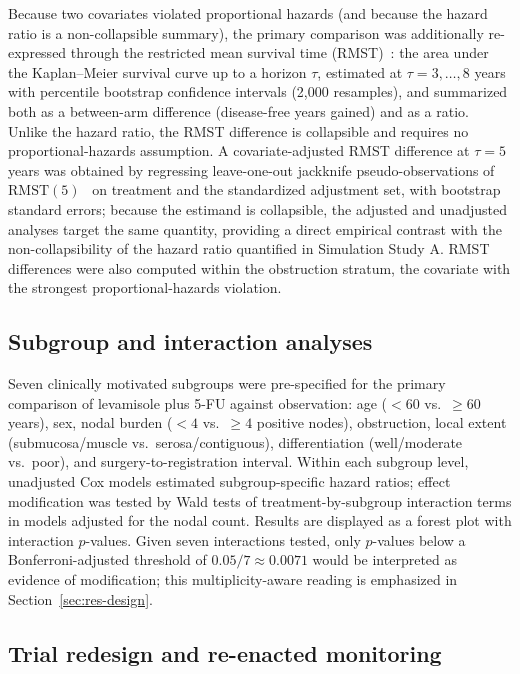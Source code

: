 Because two covariates violated proportional hazards (and because the
hazard ratio is a non-collapsible summary), the primary comparison was
additionally re-expressed through the restricted mean survival time
(RMST)~\cite{royston2011,uno2014}: the area under the Kaplan--Meier
survival curve up to a horizon $\tau$, estimated at $\tau =
3,\ldots,8$ years with percentile bootstrap confidence intervals
(2{,}000 resamples), and summarized both as a between-arm difference
(disease-free years gained) and as a ratio. Unlike the hazard ratio,
the RMST difference is collapsible and requires no
proportional-hazards assumption. A covariate-adjusted RMST difference
at $\tau = 5$ years was obtained by regressing leave-one-out jackknife
pseudo-observations of $\mathrm{RMST}(5)$~\cite{andersen2003,parner2010}
on treatment and the standardized adjustment set, with bootstrap
standard errors; because the estimand is collapsible, the adjusted and
unadjusted analyses target the same quantity, providing a direct
empirical contrast with the non-collapsibility of the hazard ratio
quantified in Simulation Study A. RMST differences were also computed
within the obstruction stratum, the covariate with the strongest
proportional-hazards violation.

\subsection{Subgroup and interaction analyses}

Seven clinically motivated subgroups were pre-specified for the primary
comparison of levamisole plus 5-FU against observation: age
($<60$ vs.\ $\geqslant 60$ years), sex, nodal burden ($<4$ vs.\ $\geqslant 4$
positive nodes), obstruction, local extent (submucosa/muscle vs.\
serosa/contiguous), differentiation (well/moderate vs.\ poor), and
surgery-to-registration interval. Within each subgroup level, unadjusted
Cox models estimated subgroup-specific hazard ratios; effect modification
was tested by Wald tests of treatment-by-subgroup interaction terms in
models adjusted for the nodal count. Results are displayed as a forest
plot with interaction $p$-values. Given seven interactions tested, only
$p$-values below a Bonferroni-adjusted threshold of $0.05/7 \approx
0.0071$ would be interpreted as evidence of modification; this
multiplicity-aware reading is emphasized in
Section~\ref{sec:res-design}.

\subsection{Trial redesign and re-enacted monitoring}\label{sec:methods-design}

